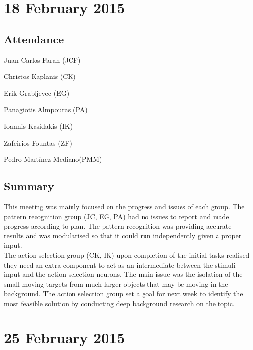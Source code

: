 \documentclass[a4paper,11pt]{article}
\begin{document}
\maketitle
\section*{18 February 2015}
\subsection*{Attendance}
\begin{compactenum}
\item Juan Carlos Farah (JCF)
\item Christos Kaplanis (CK)
\item Erik Grabljevec (EG)
\item Panagiotis Almpouras (PA)
\item Ioannis Kasidakis (IK)
\item Zafeirios Fountas (ZF)
\item Pedro Martínez Mediano(PMM)
\end{compactenum}

\subsection*{Summary}
This meeting was mainly focused on the progress and issues of each group. The pattern recognition group (JC, EG, PA) had no issues to report and made progress according to plan. The pattern recognition was providing accurate results and was modularised so that it could run independently given a proper input.
\\ The action selection group (CK, IK) upon completion of the initial tasks realised they need an extra component to act as an intermediate between the stimuli input and the action selection neurons. The main issue was the isolation of the small moving targets from much larger objects that may be moving in the background. The action selection group set a goal for next week to identify the most feasible solution by conducting deep background research on the topic.

\maketitle
\section*{25 February 2015}
\end{document}
